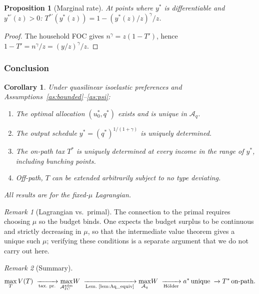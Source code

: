 \documentclass[12pt,a4paper]{article}
\theoremstyle{definition}
\theoremstyle{plain}
\newtheorem{proposition}{Proposition}[section]
\newtheorem{corollary}{Corollary}[section]
\theoremstyle{remark}
\newtheorem{remark}{Remark}[section]
\newcommand{\calA}{\mathcal{A}}
\begin{document}
\begin{proposition}[Marginal rate]
\label{prop:marginal}
At points where $y^*$ is differentiable and
$y^{*\prime}(z) > 0$:
$T^{*\prime}(y^*(z)) = 1 - (y^*(z)/z)^\gamma/z$.
\end{proposition}

\begin{proof}
The household FOC gives $n^\gamma = z(1-T')$, hence
$1-T' = n^\gamma/z = (y/z)^\gamma/z$.
\end{proof}


\subsubsection{Conclusion}

\begin{corollary}
\label{cor:T_unique}
Under quasilinear isoelastic preferences
and Assumptions~\ref{as:bounded}--\ref{as:psi}:
\begin{enumerate}[label=(\roman*)]
\item The optimal allocation $(u_0^*, q^*)$ exists
  and is unique in $\calA_q$.
\item The output schedule
  $y^* = (q^*)^{1/(1+\gamma)}$ is uniquely
  determined.
\item The on-path tax $T^*$ is uniquely determined
  at every income in the range of $y^*$, including
  bunching points.
\item Off-path, $T$ can be extended arbitrarily
  subject to no type deviating.
\end{enumerate}
All results are for the fixed-$\mu$ Lagrangian.
\end{corollary}

\begin{remark}[Lagrangian vs.\ primal]
\label{rem:lagrangian_primal}
The connection to the primal requires choosing $\mu$ so
the budget binds.  One expects the budget surplus to be
continuous and strictly decreasing in $\mu$, so that the
intermediate value theorem gives a unique such $\mu$;
verifying these conditions is a separate argument that
we do not carry out here.
\end{remark}

\begin{remark}[Summary]
\label{rem:summary}
\[
  \max_T V(T)
  \;\xrightarrow[\text{tax.\ pr.}]{}
  \max_{\calA_{IC}^{\mathrm{adm}}}\! W
  \;\xrightarrow[\text{Lem.~\ref{lem:Aq_equiv}}]{}
  \max_{\calA_q}\! W
  \;\xrightarrow[\text{H\"older}]{}
  a^*\!\text{ unique}
  \;\xrightarrow[]{}
  T^*\!\text{ on-path}.
\]
\end{remark}
\end{document}
